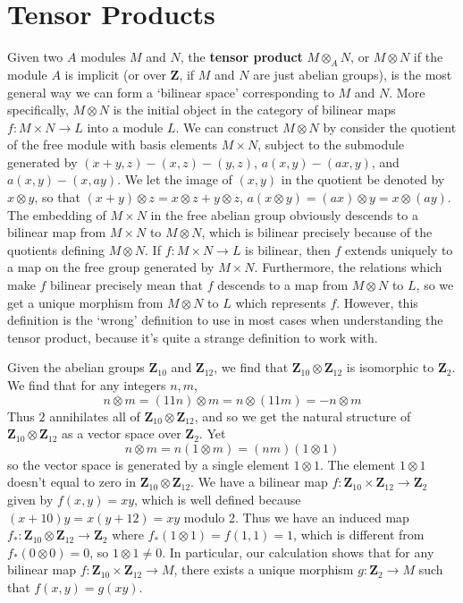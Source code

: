 \section{Tensor Products}

Given two $A$ modules $M$ and $N$, the {\bf tensor product} $M \otimes_A N$, or $M \otimes N$ if the module $A$ is implicit (or over $\mathbf{Z}$, if $M$ and $N$ are just abelian groups), is the most general way we can form a `bilinear space' corresponding to $M$ and $N$. More specifically, $M \otimes N$ is the initial object in the category of bilinear maps $f: M \times N \to L$ into a module $L$. We can construct $M \otimes N$ by consider the quotient of the free module with basis elements $M \times N$, subject to the submodule generated by $(x + y, z) - (x,z) - (y,z)$, $a(x,y) - (ax,y)$, and $a(x,y) - (x,ay)$. We let the image of $(x,y)$ in the quotient be denoted by $x \otimes y$, so that $(x + y) \otimes z = x \otimes z + y \otimes z$, $a(x \otimes y) = (ax) \otimes y = x \otimes (ay)$. The embedding of $M \times N$ in the free abelian group obviously descends to a bilinear map from $M \times N$ to $M \otimes N$, which is bilinear precisely because of the quotients defining $M \otimes N$. If $f: M \times N \to L$ is bilinear, then $f$ extends uniquely to a map on the free group generated by $M \times N$. Furthermore, the relations which make $f$ bilinear precisely mean that $f$ descends to a map from $M \otimes N$ to $L$, so we get a unique morphism from $M \otimes N$ to $L$ which represents $f$. However, this definition is the `wrong' definition to use in most cases when understanding the tensor product, because it's quite a strange definition to work with.

\begin{example}
    Given the abelian groups $\mathbf{Z}_{10}$ and $\mathbf{Z}_{12}$, we find that $\mathbf{Z}_{10} \otimes \mathbf{Z}_{12}$ is isomorphic to $\mathbf{Z}_2$. We find that for any integers $n,m$,
    \[ n \otimes m = (11n) \otimes m = n \otimes (11m) = - n \otimes m \]
    Thus $2$ annihilates all of $\mathbf{Z}_{10} \otimes \mathbf{Z}_{12}$, and so we get the natural structure of $\mathbf{Z}_{10} \otimes \mathbf{Z}_{12}$ as a vector space over $\mathbf{Z}_2$. Yet
    \[ n \otimes m = n(1 \otimes m) = (nm)(1 \otimes 1) \]
    so the vector space is generated by a single element $1 \otimes 1$. The element $1 \otimes 1$ doesn't equal to zero in $\mathbf{Z}_{10} \otimes \mathbf{Z}_{12}$. We have a bilinear map $f: \mathbf{Z}_{10} \times \mathbf{Z}_{12} \to \mathbf{Z}_2$ given by $f(x,y) = xy$, which is well defined because $(x + 10)y = x(y + 12) = xy$ modulo 2. Thus we have an induced map $f_*: \mathbf{Z}_{10} \otimes \mathbf{Z}_{12} \to \mathbf{Z}_2$ where $f_*(1 \otimes 1) = f(1,1) = 1$, which is different from $f_*(0 \otimes 0) = 0$, so $1 \otimes 1 \neq 0$. In particular, our calculation shows that for any bilinear map $f: \mathbf{Z}_{10} \times \mathbf{Z}_{12} \to M$, there exists a unique morphism $g: \mathbf{Z}_2 \to M$ such that $f(x,y) = g(xy)$.
\end{example}

